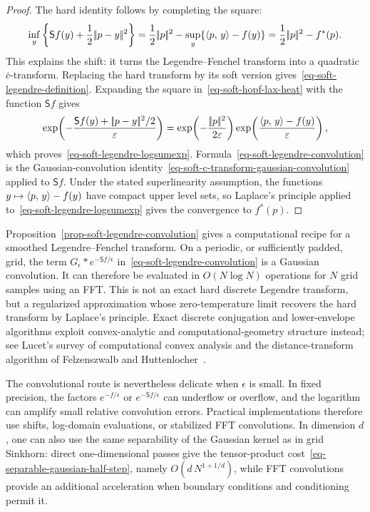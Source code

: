 \begin{proof}
The hard identity follows by completing the square:
\[
	\inf_y\left\{\mathsf S f(y)+\frac12|\!| p-y |\!|^2\right\}
	=
	\frac12|\!| p |\!|^2-
	\sup_y\{\langle p,\,y\rangle-f(y)\}
	=
	\frac12|\!| p |\!|^2-f^*(p).
\]
This explains the shift: it turns the Legendre--Fenchel transform into a quadratic $\bar c$-transform. Replacing the hard transform by its soft version gives~\eqref{eq-soft-legendre-definition}. Expanding the square in~\eqref{eq-soft-hopf-lax-heat} with the function $\mathsf S f$ gives
\[
	\exp\!\left(-\frac{\mathsf S f(y)+|\!| p-y |\!|^2/2}{\varepsilon}\right)
	=
	\exp\!\left(-\frac{|\!| p |\!|^2}{2\varepsilon}\right)
	\exp\!\left(\frac{\langle p,\,y\rangle-f(y)}{\varepsilon}\right),
\]
which proves~\eqref{eq-soft-legendre-logsumexp}. Formula~\eqref{eq-soft-legendre-convolution} is the Gaussian-convolution identity~\eqref{eq-soft-c-transform-gaussian-convolution} applied to $\mathsf S f$. Under the stated superlinearity assumption, the functions $y\mapsto\langle p,\,y\rangle-f(y)$ have compact upper level sets, so Laplace's principle applied to~\eqref{eq-soft-legendre-logsumexp} gives the convergence to $f^*(p)$.
\end{proof}

\begin{rem}\label{rem-soft-legendre-fft}
	Proposition~\ref{prop-soft-legendre-convolution} gives a computational recipe for a smoothed Legendre--Fenchel transform. On a periodic, or sufficiently padded, grid, the term $G_\epsilon\ast e^{-\mathsf S f/\epsilon}$ in~\eqref{eq-soft-legendre-convolution} is a Gaussian convolution. It can therefore be evaluated in $O(N\log N)$ operations for $N$ grid samples using an FFT\@. This is not an exact hard discrete Legendre transform, but a regularized approximation whose zero-temperature limit recovers the hard transform by Laplace's principle. Exact discrete conjugation and lower-envelope algorithms exploit convex-analytic and computational-geometry structure instead; see Lucet's survey of computational convex analysis and the distance-transform algorithm of Felzenszwalb and Huttenlocher~\cite{Lucet2010ComputationalConvexAnalysis,FelzenszwalbHuttenlocher2012DistanceTransforms}.

	The convolutional route is nevertheless delicate when $\epsilon$ is small. In fixed precision, the factors $e^{-f/\epsilon}$ or $e^{-\mathsf S f/\epsilon}$ can underflow or overflow, and the logarithm can amplify small relative convolution errors. Practical implementations therefore use shifts, log-domain evaluations, or stabilized FFT convolutions. In dimension $d$, one can also use the same separability of the Gaussian kernel as in grid Sinkhorn: direct one-dimensional passes give the tensor-product cost~\eqref{eq-separable-gaussian-half-step}, namely $O(d\,N^{1+1/d})$, while FFT convolutions provide an additional acceleration when boundary conditions and conditioning permit it.
\end{rem}

